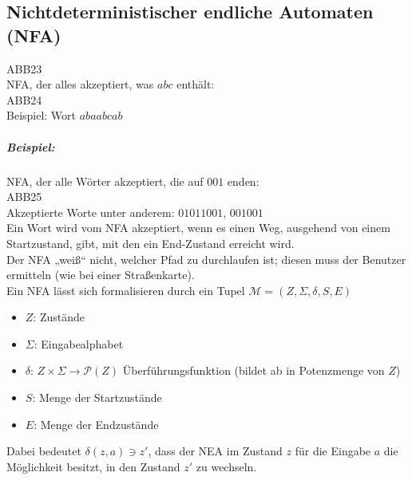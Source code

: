 \subsection{Nichtdeterministischer endliche Automaten (NFA)}
ABB23\\
NFA, der alles akzeptiert, was $abc$ enthält:\\
ABB24\\
Beispiel: Wort $abaabcab$
\subparagraph{Beispiel:} NFA, der alle Wörter akzeptiert, die auf $001$ enden:\\
ABB25\\
Akzeptierte Worte unter anderem: $01011001$, $001001$\\
Ein Wort wird vom NFA akzeptiert, wenn es einen Weg, ausgehend von einem Startzustand, gibt, mit den ein End-Zustand erreicht wird.\\
Der NFA „weiß“ nicht, welcher Pfad zu durchlaufen ist; diesen muss der Benutzer ermitteln (wie bei einer Straßenkarte).\\
Ein NFA lässt sich formalisieren durch ein Tupel $\mathcal{M}=(Z, \Sigma, \delta, S, E)$
\begin{itemize}
\item $Z$: Zustände
\item $\Sigma$: Eingabealphabet
\item $\delta$: $Z \times \Sigma \to \mathcal{P}(Z)$ Überführungsfunktion (bildet ab in Potenzmenge von $Z$)
\item $S$: Menge der Startzustände
\item $E$: Menge der Endzustände
\end{itemize}
Dabei bedeutet $\delta(z,a)\ni z'$, dass der NEA im Zustand $z$ für die Eingabe $a$ die Möglichkeit besitzt, in den Zustand $z'$ zu wechseln.

